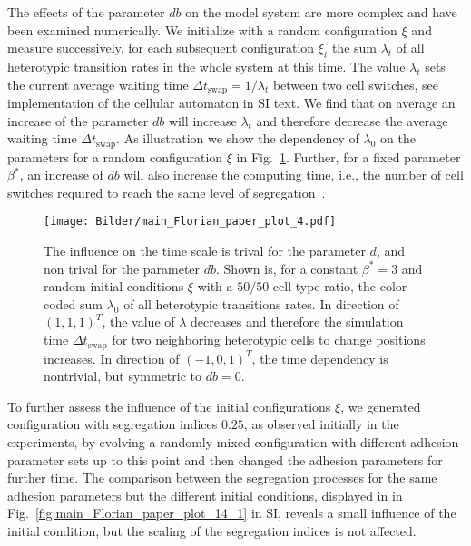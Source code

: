 \documentclass[10pt,letterpaper]{article}
\newcommand{\figref}[1]{Fig.~\ref{fig:#1}}
\begin{document}
The effects of the parameter $db$ on the model system are more complex
and have been examined numerically. We initialize with a random
configuration $\xi$ and measure successively, for each subsequent
configuration $\xi_t$ the sum $\lambda_t$ of all heterotypic
transition rates in the whole system at this time. The value
$\lambda_t$ sets the current average waiting time
$\Delta t_\text{swap} = 1/\lambda_t$ between two cell switches, see
implementation of the cellular automaton in SI text. We find that on
average an increase of the parameter $db$ will increase $\lambda_t$
and therefore decrease the average waiting time
$\Delta t_\text{swap}$. As illustration we show the dependency of
$\lambda_0$ on the parameters for a random configuration $\xi$ in
\figref{main_Florian_paper_plot_4}. Further, for a fixed parameter
$\beta^*$, an increase of $db$ will also increase the computing time, i.e.,
the number of cell switches required to reach the same level of
segregation~\cite{RosBoeLanVos2021}.

\begin{figure}[ht!]
 \centering
 \texttt{[image: Bilder/main\_Florian\_paper\_plot\_4.pdf]}
 \caption{The influence on the time scale is trival for the parameter
   $d$, and non trival for the parameter $db$. Shown is, for a
   constant $\beta^*=3$ and random initial conditions $\xi$ with a
   $50/50$ cell type ratio, the color coded sum $\lambda_0$ of all
   heterotypic transitions rates. In direction of $(1,1,1)^T$, the
   value of $\lambda$ decreases and therefore the simulation time
   $\Delta t_\text{swap}$ for two neighboring heterotypic cells to
   change positions increases. In direction of $(-1,0,1)^T$, the time
   dependency is nontrivial, but symmetric to $db=0$.}
 \label{fig:main_Florian_paper_plot_4}
\end{figure}

To further assess the influence of the initial configurations $\xi$, we
generated configuration with segregation indices $0.25$, as observed
initially in the experiments, by evolving a randomly mixed configuration
with different adhesion parameter sets up to this point and then
changed the adhesion parameters for further time. The comparison
between the segregation processes for the same adhesion parameters but
the different initial conditions, displayed in in
\figref{main_Florian_paper_plot_14_1} in SI, reveals a small influence
of the initial condition, but the scaling of the segregation indices is
not affected.
\end{document}
